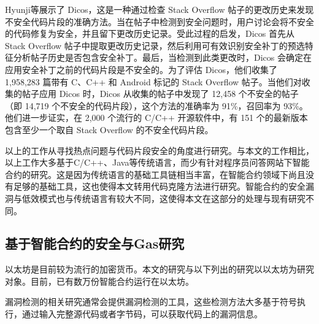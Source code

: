 
Hyunji等\cite{dicos}展示了 Dicos，这是一种通过检查 Stack Overflow 帖子的更改历史来发现不安全代码片段的准确方法。当在帖子中检测到安全问题时，用户讨论会将不安全的代码修复为安全，并且留下更改历史记录。受此过程的启发，Dicos 首先从 Stack Overflow 帖子中提取更改历史记录，然后利用可有效识别安全补丁的预选特征分析帖子历史是否包含安全补丁。最后，当检测到此类更改时，Dicos 会确定在应用安全补丁之前的代码片段是不安全的。为了评估 Dicos，他们收集了 1,958,283 篇带有 C、C++ 和 Android 标记的 Stack Overflow 帖子。当他们对收集的帖子应用 Dicos 时，Dicos 从收集的帖子中发现了 12,458 个不安全的帖子（即 14,719 个不安全的代码片段），这个方法的准确率为 91\%，召回率为 93\%。他们进一步证实，在 2,000 个流行的 C/C++ 开源软件中，有 151 个的最新版本包含至少一个取自 Stack Overflow 的不安全代码片段。

以上的工作从寻找热点问题与代码片段安全的角度进行研究。与本文的工作相比，以上工作大多基于C/C++、Java等传统语言，而少有针对程序员问答网站下智能合约的研究。这是因为传统语言的基础工具链相当丰富，在智能合约领域下尚且没有足够的基础工具，这也使得本文转用代码克隆方法进行研究。智能合约的安全漏洞与低效模式也与传统语言有较大不同，这使得本文在这部分的处理与现有研究不同。

\subsection{基于智能合约的安全与Gas研究}

以太坊是目前较为流行的加密货币。本文的研究与以下列出的研究以以太坊为研究对象。目前，已有数万份智能合约运行在以太坊。

漏洞检测的相关研究通常会提供漏洞检测的工具，这些检测方法大多基于符号执行，通过输入完整源代码或者字节码，可以获取代码上的漏洞信息。

